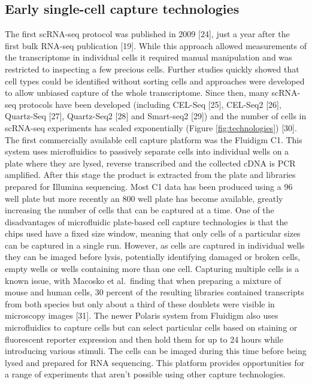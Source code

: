 \documentclass[11pt,a4paper,titlepage,twoside,openright]{style/unimelbthesis}
\theoremstyle{definition}
\theoremstyle{definition}
\theoremstyle{definition}
\theoremstyle{remark}
\begin{document}
\begin{mainmatter}
\hypertarget{early-single-cell-capture-technologies}{%
\subsection{Early single-cell capture technologies}\label{early-single-cell-capture-technologies}}

The first scRNA-seq protocol was published in 2009 {[}24{]}, just a year after the first bulk RNA-seq publication {[}19{]}. While this approach allowed measurements of the transcriptome in individual cells it required manual manipulation and was restricted to inspecting a few precious cells. Further studies quickly showed that cell types could be identified without sorting cells and approaches were developed to allow unbiased capture of the whole transcriptome. Since then, many scRNA-seq protocols have been developed (including CEL-Seq {[}25{]}, CEL-Seq2 {[}26{]}, Quartz-Seq {[}27{]}, Quartz-Seq2 {[}28{]} and Smart-seq2 {[}29{]}) and the number of cells in scRNA-seq experiments has scaled exponentially (Figure \ref{fig:technologies}) {[}30{]}. The first commercially available cell capture platform was the Fluidigm C1. This system uses microfluidics to passively separate cells into individual wells on a plate where they are lysed, reverse transcribed and the collected cDNA is PCR amplified. After this stage the product is extracted from the plate and libraries prepared for Illumina sequencing. Most C1 data has been produced using a 96 well plate but more recently an 800 well plate has become available, greatly increasing the number of cells that can be captured at a time. One of the disadvantages of microfluidic plate-based cell capture technologies is that the chips used have a fixed size window, meaning that only cells of a particular sizes can be captured in a single run. However, as cells are captured in individual wells they can be imaged before lysis, potentially identifying damaged or broken cells, empty wells or wells containing more than one cell. Capturing multiple cells is a known issue, with Macosko et al.~finding that when preparing a mixture of mouse and human cells, 30 percent of the resulting libraries contained transcripts from both species but only about a third of these doublets were visible in microscopy images {[}31{]}. The newer Polaris system from Fluidigm also uses microfluidics to capture cells but can select particular cells based on staining or fluorescent reporter expression and then hold them for up to 24 hours while introducing various stimuli. The cells can be imaged during this time before being lysed and prepared for RNA sequencing. This platform provides opportunities for a range of experiments that aren't possible using other capture technologies.


\end{mainmatter}
\end{document}
